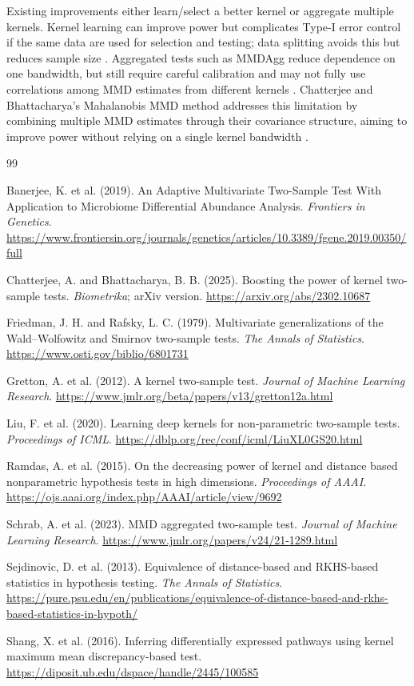 \documentclass[12pt]{article}
\begin{document}
Existing improvements either learn/select a better kernel or aggregate multiple kernels. Kernel learning can improve power but complicates Type-I error control if the same data are used for selection and testing; data splitting avoids this but reduces sample size \cite{liu2020deepkernel}. Aggregated tests such as MMDAgg reduce dependence on one bandwidth, but still require careful calibration and may not fully use correlations among MMD estimates from different kernels \cite{schrab2023mmdagg}. Chatterjee and Bhattacharya's Mahalanobis MMD method addresses this limitation by combining multiple MMD estimates through their covariance structure, aiming to improve power without relying on a single kernel bandwidth \cite{chatterjee2025boosting}.

\begin{thebibliography}{99}

Banerjee, K. et al. (2019).
An Adaptive Multivariate Two-Sample Test With Application to Microbiome Differential Abundance Analysis.
\textit{Frontiers in Genetics}.
\url{https://www.frontiersin.org/journals/genetics/articles/10.3389/fgene.2019.00350/full}

Chatterjee, A. and Bhattacharya, B. B. (2025).
Boosting the power of kernel two-sample tests.
\textit{Biometrika}; arXiv version.
\url{https://arxiv.org/abs/2302.10687}

Friedman, J. H. and Rafsky, L. C. (1979).
Multivariate generalizations of the Wald--Wolfowitz and Smirnov two-sample tests.
\textit{The Annals of Statistics}.
\url{https://www.osti.gov/biblio/6801731}

Gretton, A. et al. (2012).
A kernel two-sample test.
\textit{Journal of Machine Learning Research}.
\url{https://www.jmlr.org/beta/papers/v13/gretton12a.html}

Liu, F. et al. (2020).
Learning deep kernels for non-parametric two-sample tests.
\textit{Proceedings of ICML}.
\url{https://dblp.org/rec/conf/icml/LiuXL0GS20.html}

Ramdas, A. et al. (2015).
On the decreasing power of kernel and distance based nonparametric hypothesis tests in high dimensions.
\textit{Proceedings of AAAI}.
\url{https://ojs.aaai.org/index.php/AAAI/article/view/9692}

Schrab, A. et al. (2023).
MMD aggregated two-sample test.
\textit{Journal of Machine Learning Research}.
\url{https://www.jmlr.org/papers/v24/21-1289.html}

Sejdinovic, D. et al. (2013).
Equivalence of distance-based and RKHS-based statistics in hypothesis testing.
\textit{The Annals of Statistics}.
\url{https://pure.psu.edu/en/publications/equivalence-of-distance-based-and-rkhs-based-statistics-in-hypoth/}

Shang, X. et al. (2016).
Inferring differentially expressed pathways using kernel maximum mean discrepancy-based test.
\url{https://diposit.ub.edu/dspace/handle/2445/100585}

\end{thebibliography}
\end{document}
